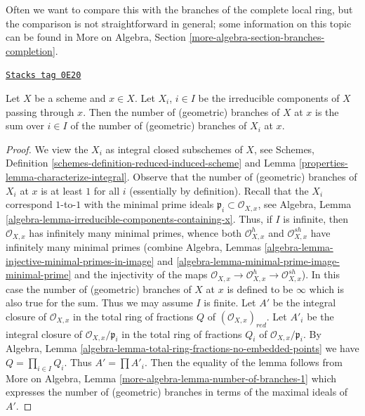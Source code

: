 Often we want to compare this with the branches of the complete local
ring, but the comparison is not straightforward in general; some information
on this topic can be found in More on Algebra, Section
\ref{more-algebra-section-branches-completion}.

\begin{lemma}
\label{properties-lemma-number-of-branches-irreducible-components}
\href{https://stacks.math.columbia.edu/tag/0E20}{\texttt{Stacks tag 0E20}}

Let $X$ be a scheme and $x \in X$. Let $X_i$, $i \in I$ be the
irreducible components of $X$ passing through $x$.
Then the number of (geometric) branches of $X$ at $x$
is the sum over $i \in I$ of the number of (geometric)
branches of $X_i$ at $x$.
\end{lemma}

\begin{proof}

We view the $X_i$ as integral closed subschemes of $X$, see
Schemes, Definition \ref{schemes-definition-reduced-induced-scheme} and
Lemma \ref{properties-lemma-characterize-integral}.
Observe that the number of (geometric) branches of $X_i$ at $x$
is at least $1$ for all $i$ (essentially by definition).
Recall that the $X_i$ correspond $1$-to-$1$ with the minimal
prime ideals $\mathfrak p_i \subset \mathcal{O}_{X, x}$, see
Algebra, Lemma \ref{algebra-lemma-irreducible-components-containing-x}.
Thus, if $I$ is infinite, then $\mathcal{O}_{X, x}$ has infinitely
many minimal primes, whence both $\mathcal{O}_{X, x}^h$
and $\mathcal{O}_{X, x}^{sh}$ have infinitely many minimal
primes (combine Algebra, Lemmas
\ref{algebra-lemma-injective-minimal-primes-in-image} and
\ref{algebra-lemma-minimal-prime-image-minimal-prime} and
the injectivity of the maps
$\mathcal{O}_{X, x} \to  \mathcal{O}_{X, x}^h \to \mathcal{O}_{X, x}^{sh}$).
In this case the number of (geometric) branches of $X$ at $x$
is defined to be $\infty$ which is also true for the sum.
Thus we may assume $I$ is finite.
Let $A'$ be the integral closure of $\mathcal{O}_{X, x}$
in the total ring of fractions $Q$ of $(\mathcal{O}_{X, x})_{red}$.
Let $A'_i$ be the  integral closure of $\mathcal{O}_{X, x}/\mathfrak p_i$
in the total ring of fractions $Q_i$ of $\mathcal{O}_{X, x}/\mathfrak p_i$.
By Algebra, Lemma \ref{algebra-lemma-total-ring-fractions-no-embedded-points}
we have $Q = \prod_{i \in I} Q_i$. Thus $A' = \prod A'_i$.
Then the equality of the lemma follows from
More on Algebra, Lemma \ref{more-algebra-lemma-number-of-branches-1}
which expresses the number of (geometric) branches in terms
of the maximal ideals of $A'$.
\end{proof}


